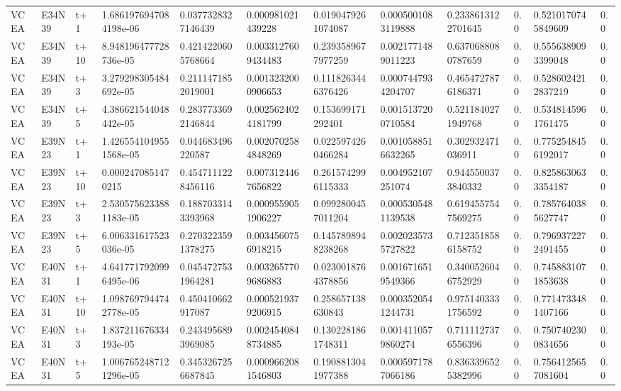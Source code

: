 \begin{landscape}
\begin{longtable}{llllllllllll}
VCEA & E34N39 & t+1 & 1.6861976947084198e-06 & 0.0377328327146439 & 0.000981021439228 & 0.0190479261074087 & 0.0005001083119888 & 0.2338613122701645 & 0.0 & 0.5210170745849609 & 0.0 \\
VCEA & E34N39 & t+10 & 8.948196477728736e-05 & 0.4214220605768664 & 0.0033127609434483 & 0.2393589677977259 & 0.0021771489011223 & 0.6370688080787659 & 0.0 & 0.5556389093399048 & 0.0 \\
VCEA & E34N39 & t+3 & 3.279298305484692e-05 & 0.2111471852019001 & 0.0013232000906653 & 0.1118263446376426 & 0.0007447934204707 & 0.4654727876186371 & 0.0 & 0.5286024212837219 & 0.0 \\
VCEA & E34N39 & t+5 & 4.386621544048442e-05 & 0.2837733692146844 & 0.0025624024181799 & 0.153699171292401 & 0.0015137200710584 & 0.5211840271949768 & 0.0 & 0.5348145961761475 & 0.0 \\
VCEA & E39N23 & t+1 & 1.4265541049551568e-05 & 0.044683496220587 & 0.0020702584848269 & 0.0225974260466284 & 0.0010588516632265 & 0.302932471036911 & 0.0 & 0.7752548456192017 & 0.0 \\
VCEA & E39N23 & t+10 & 0.0002470851470215 & 0.4547111228456116 & 0.0073124467656822 & 0.2615742996115333 & 0.004952107251074 & 0.9445500373840332 & 0.0 & 0.8258630633354187 & 0.0 \\
VCEA & E39N23 & t+3 & 2.5305756233881183e-05 & 0.1887033143393968 & 0.0009559051906227 & 0.0992800457011204 & 0.0005305481139538 & 0.6194557547569275 & 0.0 & 0.7857640385627747 & 0.0 \\
VCEA & E39N23 & t+5 & 6.006331617523036e-05 & 0.2703223591378275 & 0.0034560756918215 & 0.1457898948238268 & 0.0020235735727822 & 0.7123518586158752 & 0.0 & 0.7969372272491455 & 0.0 \\
VCEA & E40N31 & t+1 & 4.6417717920996495e-06 & 0.0454727531964281 & 0.0032657709686883 & 0.0230018764378856 & 0.0016716519549366 & 0.3400526046752929 & 0.0 & 0.7458831071853638 & 0.0 \\
VCEA & E40N31 & t+10 & 1.0987697944742778e-05 & 0.450410662917087 & 0.0005219379206915 & 0.258657138630843 & 0.0003520541244731 & 0.9751403331756592 & 0.0 & 0.7714733481407166 & 0.0 \\
VCEA & E40N31 & t+3 & 1.837211676334193e-05 & 0.2434956893969085 & 0.0024540848734885 & 0.1302281861748311 & 0.0014110579860274 & 0.7111127376556396 & 0.0 & 0.7507402300834656 & 0.0 \\
VCEA & E40N31 & t+5 & 1.0067652487121296e-05 & 0.3453267256687845 & 0.0009662081546803 & 0.1908813041977388 & 0.0005971787066186 & 0.8363396525382996 & 0.0 & 0.7564125657081604 & 0.0 \\

\end{longtable}
\end{landscape}
